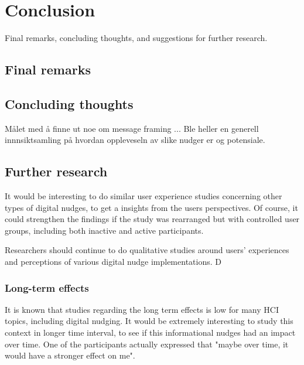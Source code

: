 \chapter{Conclusion} 

Final remarks, concluding thoughts, and suggestions for further research.
\section{Final remarks}

\section{Concluding thoughts}
Målet med å finne ut noe om message framing ...
Ble heller en generell innnsiktsamling på hvordan oppleveseln av slike nudger er og potensiale. 

\section{Further research}

It would be interesting to do similar user experience studies concerning other types of digital nudges, to get a insights from the users perspectives. Of course, it could strengthen the findings if the study was rearranged but with controlled user groups, including both inactive and active participants.   

Researchers should continue to do qualitative studies around users' experiences and perceptions of various digital nudge implementations. D

\subsection{Long-term effects}
It is known that studies regarding the long term effects is low for many HCI topics, including digital nudging. It would be extremely interesting to study this context in longer time interval, to see if this informational nudges had an impact over time. One of the participants actually expressed that "maybe over time, it would have a stronger effect on me". 